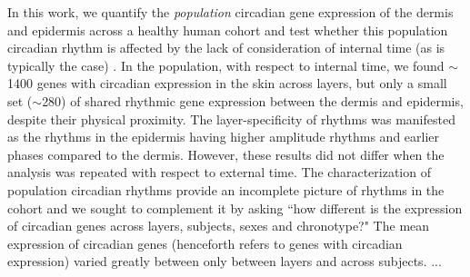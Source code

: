 In this work, we quantify the \emph{population} circadian gene expression of the dermis and epidermis across a healthy human cohort and test whether this population circadian rhythm is affected by the lack of consideration of internal time (as is typically the case) . In the population, with respect to internal time, we found $\sim$1400 genes with circadian expression in the skin across layers, but only a small set ($\sim$280) of shared rhythmic gene expression between the dermis and epidermis, despite their physical proximity. The layer-specificity of rhythms was manifested as the rhythms in the epidermis having higher amplitude rhythms and earlier phases compared to the dermis. However, these results did not differ when the analysis was repeated with respect to external time. The characterization of population circadian rhythms provide an incomplete picture of rhythms in the cohort and we sought to complement it by asking ``how different is the expression of circadian genes across layers, subjects, sexes and chronotype?" The mean expression of circadian genes (henceforth refers to genes with circadian expression) varied greatly between only between layers and across subjects. ... 

